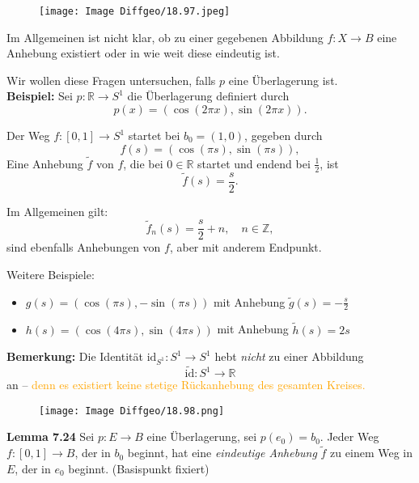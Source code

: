 \documentclass[fleqn, 12pt, letterpaper]{article}
\begin{document}
\begin{figure}[H]
    \centering
    \texttt{[image: Image Diffgeo/18.97.jpeg]}
 \end{figure}

Im Allgemeinen ist nicht klar, ob zu einer gegebenen Abbildung \( f : X \to B \) eine Anhebung existiert oder in wie weit diese eindeutig ist.

Wir wollen diese Fragen untersuchen, falls \( p \) eine Überlagerung ist.\\

\textbf{Beispiel:} Sei \( p : \mathbb{R} \to S^1 \) die Überlagerung definiert durch
\[
p(x) = (\cos(2\pi x), \sin(2\pi x)).
\]

Der Weg \( f : [0,1] \to S^1 \) startet bei $b_0=(1,0)$, gegeben durch
\[
f(s) = (\cos(\pi s), \sin(\pi s)),
\]
Eine Anhebung \( \tilde{f} \) von \( f \), die bei \( 0 \in \mathbb{R} \) startet und endend bei $\frac{1}{2}$, ist
\[
\tilde{f}(s) = \frac{s}{2}.
\]

Im Allgemeinen gilt:
\[
\tilde{f}_n(s) = \frac{s}{2} + n, \quad n \in \mathbb{Z},
\]
sind ebenfalls Anhebungen von \( f \), aber mit anderem Endpunkt.

Weitere Beispiele:
\begin{itemize}
    \item \( g(s) = (\cos(\pi s), -\sin(\pi s)) \) mit Anhebung \( \tilde{g}(s) = -\frac{s}{2} \)
    \item \( h(s) = (\cos(4\pi s), \sin(4\pi s)) \) mit Anhebung \( \tilde{h}(s) = 2s \)
\end{itemize}

\textbf{Bemerkung:} Die Identität \( \mathrm{id}_{S^1} : S^1 \to S^1 \) hebt \emph{nicht} zu einer Abbildung
\[
\tilde{\mathrm{id}} : S^1 \to \mathbb{R}
\]
an – \textcolor{orange}{denn es existiert keine stetige Rückanhebung des gesamten Kreises.}

\begin{figure}[H]
    \centering
    \texttt{[image: Image Diffgeo/18.98.png]}
 \end{figure}

\textbf{Lemma 7.24}
Sei \( p : E \to B \) eine Überlagerung, sei \( p(e_0) = b_0 \). Jeder Weg \( f : [0,1] \to B \), der in \( b_0 \) beginnt, hat eine \emph{eindeutige Anhebung} \( \tilde{f} \) zu einem Weg in \( E \), der in \( e_0 \) beginnt. (Basispunkt fixiert)
\end{document}
